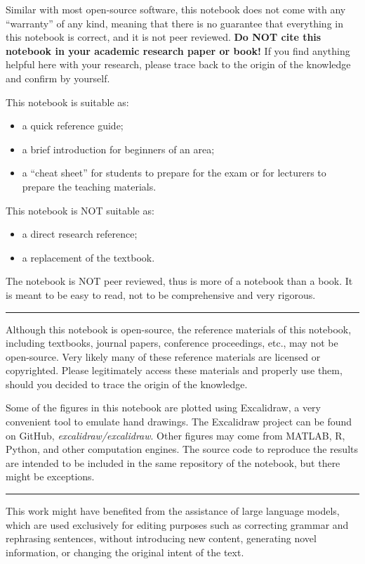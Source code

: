 Similar with most open-source software, this notebook does not come with any ``warranty'' of any kind, meaning that there is no guarantee that everything in this notebook is correct, and it is not peer reviewed. \textbf{Do NOT cite this notebook in your academic research paper or book!} If you find anything helpful here with your research, please trace back to the origin of the knowledge and confirm by yourself.

\vspace{0.1in}

This notebook is suitable as:
\begin{itemize}
  \item a quick reference guide;
  \item a brief introduction for beginners of an area;
  \item a ``cheat sheet'' for students to prepare for the exam or for lecturers to prepare the teaching materials.
\end{itemize}

This notebook is NOT suitable as:
\begin{itemize}
  \item a direct research reference;
  \item a replacement of the textbook.
\end{itemize}
The notebook is NOT peer reviewed, thus is more of a notebook than a book. It is meant to be easy to read, not to be comprehensive and very rigorous.

\vspace{0.1in}
\noindent \rule{1in}{0.4pt}
\vspace{0.1in}

Although this notebook is open-source, the reference materials of this notebook, including textbooks, journal papers, conference proceedings, etc., may not be open-source. Very likely many of these reference materials are licensed or copyrighted. Please legitimately access these materials and properly use them, should you decided to trace the origin of the knowledge.

Some of the figures in this notebook are plotted using Excalidraw, a very convenient tool to emulate hand drawings. The Excalidraw project can be found on GitHub, \textit{excalidraw/excalidraw}. Other figures may come from MATLAB, R, Python, and other computation engines. The source code to reproduce the results are intended to be included in the same repository of the notebook, but there might be exceptions.

\vspace{0.1in}
\noindent \rule{1in}{0.4pt}
\vspace{0.1in}

This work might have benefited from the assistance of large language models, which are used exclusively for editing purposes such as correcting grammar and rephrasing sentences, without introducing new content, generating novel information, or changing the original intent of the text.

